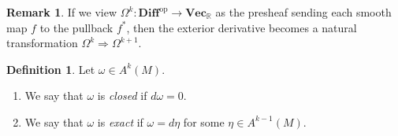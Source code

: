 \documentclass[10pt,letterpaper,cm]{nupset}
\theoremstyle{definition}
\newtheorem*{definition}{Definition}
\newtheorem{remark}{Remark}
\newcommand{\R}{\mathbb R}
\newcommand{\1}{\mathbf{1}}
\newcommand{\0}{\vec 0}
\begin{document}
\begin{remark}
If we view $\Omega^k : \textbf{Diff}^{\text{op}} \to \textbf{Vec}_{\R}$ as the presheaf sending each smooth map $f$ to the pullback $f^{\ast}$, then the exterior derivative becomes a natural transformation $\Omega^k \Rightarrow \Omega^{k+1}$.  
\end{remark}

\begin{definition} Let $\omega \in A^k(M)$.
\begin{enumerate}
\item We say that $\omega$ is \textit{closed} if $d \omega = 0$.
\item We say that $\omega$ is \textit{exact} if $\omega = d \eta$ for some $\eta \in A^{k-1}(M)$.
\end{enumerate}
\end{definition}
\end{document}
